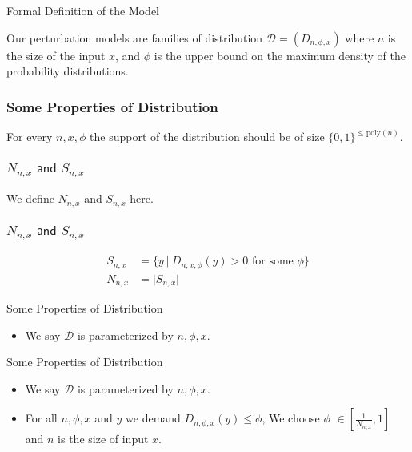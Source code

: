 \begin{frame}{Formal Definition of the Model}
    \begin{center}
        Our perturbation models are families of distribution $\mathcal{D} = (D_{n, \phi, x})$ where $n$ is the size of the input $x$, and $\phi$ is the upper bound on the maximum density of the probability distributions.
    \end{center}
\end{frame}

\begin{frame}
    \frametitle{Some Properties of Distribution}

    \begin{center}
        For every $n, x, \phi$ the support of the distribution should be
        of size $\{0,1\} ^{\leq \text{poly}(n)}$.
    \end{center}

\end{frame}


\begin{frame}
    \frametitle{$N_{n, x} \textsf{ and } S_{n, x}$}

    \begin{center}
        We define $N_{n, x} \text{ and } S_{n, x}$ here.
    \end{center}

\end{frame}


\begin{frame}
    \frametitle{$N_{n, x} \textsf{ and } S_{n, x}$}

    \begin{align*}
        S_{n, x} &= \{y \: \vert \: D_{n, x, \phi}(y) > 0 \text{ for some } \phi\} \\
        N_{n, x} &= \vert S_{n, x} \vert
    \end{align*}

\end{frame}


\begin{frame}{Some Properties of Distribution}
    \begin{itemize}
        \item We say $\mathcal{D}$ is parameterized by $n, \phi, x$.
    \end{itemize}
\end{frame}

\begin{frame}{Some Properties of Distribution}
    \begin{itemize}
        \item We say $\mathcal{D}$ is parameterized by $n, \phi, x$.
        \item For all $n, \phi, x$ and $y$ we demand $D_{n, \phi, x}(y) \leq \phi$,
        We choose $\phi$ $\in [\frac{1}{N_{n, x}}, 1]$ and $n$ is the size of input $x$.
    \end{itemize}
\end{frame}

